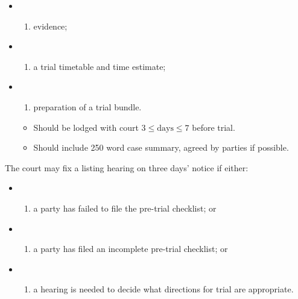 \documentclass[
]{article}
\providecommand{\tightlist}{%
  \setlength{\itemsep}{0pt}\setlength{\parskip}{0pt}}
\begin{document}
\begin{itemize}
\item
  \begin{enumerate}
  \def\labelenumi{(\alph{enumi})}
  \tightlist
  \item
    evidence;
  \end{enumerate}
\item
  \begin{enumerate}
  \def\labelenumi{(\alph{enumi})}
  \setcounter{enumi}{1}
  \tightlist
  \item
    a trial timetable and time estimate;
  \end{enumerate}
\item
  \begin{enumerate}
  \def\labelenumi{(\alph{enumi})}
  \setcounter{enumi}{2}
  \tightlist
  \item
    preparation of a trial bundle.
  \end{enumerate}

  \begin{itemize}
  \tightlist
  \item
    Should be lodged with court \(3\leq \text{days} \leq 7\) before
    trial.
  \item
    Should include 250 word case summary, agreed by parties if possible.
  \end{itemize}
\end{itemize}

The court may fix a listing hearing on three days' notice if either:

\begin{itemize}
\item
  \begin{enumerate}
  \def\labelenumi{(\alph{enumi})}
  \tightlist
  \item
    a party has failed to file the pre-trial checklist; or
  \end{enumerate}
\item
  \begin{enumerate}
  \def\labelenumi{(\alph{enumi})}
  \setcounter{enumi}{1}
  \tightlist
  \item
    a party has filed an incomplete pre-trial checklist; or
  \end{enumerate}
\item
  \begin{enumerate}
  \def\labelenumi{(\alph{enumi})}
  \setcounter{enumi}{2}
  \tightlist
  \item
    a hearing is needed to decide what directions for trial are
    appropriate.
  \end{enumerate}
\end{itemize}
\end{document}
